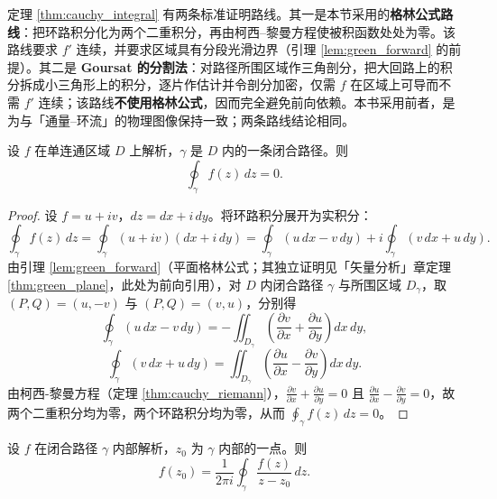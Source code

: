 \begin{remark}[柯西积分定理的两条证明路线]\label{rem:cauchy_without_green}
定理 \ref{thm:cauchy_integral} 有两条标准证明路线。其一是本节采用的\textbf{格林公式路线}：把环路积分化为两个二重积分，再由柯西–黎曼方程使被积函数处处为零。该路线要求 $f'$ 连续，并要求区域具有分段光滑边界（引理 \ref{lem:green_forward} 的前提）。其二是 \textbf{Goursat 的分割法}：对路径所围区域作三角剖分，把大回路上的积分拆成小三角形上的积分，逐片作估计并令剖分加密，仅需 $f$ 在区域上可导而不需 $f'$ 连续；该路线\textbf{不使用格林公式}，因而完全避免前向依赖。本书采用前者，是为与「通量–环流」的物理图像保持一致；两条路线结论相同。
\end{remark}

\begin{theorem}[柯西积分定理]\label{thm:cauchy_integral}
设 $f$ 在单连通区域 $D$ 上解析，$\gamma$ 是 $D$ 内的一条闭合路径。则
\[
\oint_\gamma f(z)\,dz = 0.
\]
\end{theorem}

\begin{proof}
设 $f = u + iv$，$dz = dx + i\,dy$。将环路积分展开为实积分：
\[
\oint_\gamma f(z)\,dz = \oint_\gamma (u + iv)(dx + i\,dy) = \oint_\gamma (u\,dx - v\,dy) + i \oint_\gamma (v\,dx + u\,dy).
\]
由引理 \ref{lem:green_forward}（平面格林公式；其独立证明见「矢量分析」章定理 \ref{thm:green_plane}，此处为前向引用），对 $D$ 内闭合路径 $\gamma$ 与所围区域 $D_\gamma$，取 $(P,Q) = (u,-v)$ 与 $(P,Q) = (v,u)$，分别得
\[
\oint_\gamma (u\,dx - v\,dy) = -\iint_{D_\gamma} \left( \frac{\partial v}{\partial x} + \frac{\partial u}{\partial y} \right) dx\,dy,
\]
\[
\oint_\gamma (v\,dx + u\,dy) = \iint_{D_\gamma} \left( \frac{\partial u}{\partial x} - \frac{\partial v}{\partial y} \right) dx\,dy.
\]
由柯西-黎曼方程（定理 \ref{thm:cauchy_riemann}），$\frac{\partial v}{\partial x} + \frac{\partial u}{\partial y} = 0$ 且 $\frac{\partial u}{\partial x} - \frac{\partial v}{\partial y} = 0$，故两个二重积分均为零，两个环路积分均为零，从而 $\oint_\gamma f(z)\,dz = 0$。
\end{proof}

\begin{theorem}[柯西积分公式]\label{thm:cauchy_integral_formula}
设 $f$ 在闭合路径 $\gamma$ 内部解析，$z_0$ 为 $\gamma$ 内部的一点。则
\[
f(z_0) = \frac{1}{2\pi i} \oint_\gamma \frac{f(z)}{z - z_0}\,dz.
\]
\end{theorem}

